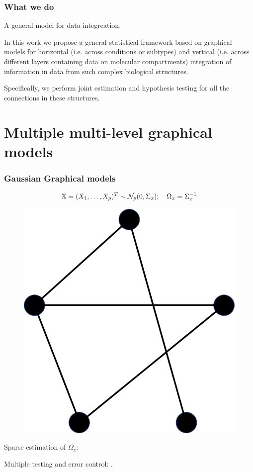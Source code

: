\documentclass[10pt]{beamer}
\theoremstyle{definition}
\begin{document}
\begin{frame}
\frametitle{What we do}

{\colrbf A general model for data integreation.}
\vspace{1em}

In this work we propose a general statistical framework based on graphical models for {\colbit horizontal} (i.e. across conditions or subtypes) {\colbit and vertical} (i.e. across different layers containing data on molecular compartments) {\colbit integration of information} in data from such complex biological structures.

\vspace{1em}
Specifically, we perform {\colbit joint estimation and hypothesis testing} for all the connections in these structures.

\end{frame}

\section{Multiple multi-level graphical models}

\begin{frame}
\frametitle{Gaussian Graphical models}

\[
{\mathbb{X}} = (X_1, \ldots, X_p)^T \sim {\cal{N}}_p (0, \Sigma_x); \quad
\Omega_x = \Sigma_x^{-1}
\]

\begin{figure}
\centering
\includegraphics[width=.4\textwidth]{formulation_2}
\end{figure}

Sparse estimation of $\Omega_x$: {\colr \cite{MeisenBuhlmann06}}

Multiple testing and error control: {\colr \cite{DrtonPerlman07}}.

\end{frame}
\end{document}
